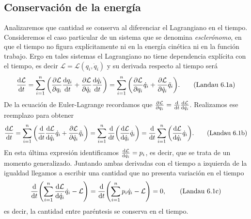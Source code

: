\documentclass[12pt, spanish, a4paper, ]{article}
\begin{document}
\subsection{Conservación de la energía}\label{conservacionEnergia} %
Analizaremos que cantidad se conserva al diferenciar el Lagrangiano en el tiempo.
Consideremos el caso particular de un sistema que se denomina \emph{esclerónomo}, en que el tiempo no figura explícitamente ni en la energía cinética ni en la función trabajo.
Ergo en tales sistemas el Lagrangiano no tiene dependencia explícita con el tiempo, es decir \(\mathcal{L}= \mathcal{L}(q_i, \dot{q}_i)\) y su derivada respecto al tiempo será
\begin{equation}\label{Landau6.1a}
	\dv{\mathcal{L}}{t}= \sum_{i=1}^n \pqty{ \pdv{\mathcal{L}}{q_i} \dv{q_i}{t}+ \pdv{\mathcal{L}}{\dot{q}_i} \dv{\dot{q}_i}{t} }
	= \sum_{i=1}^n \pqty{ \pdv{\mathcal{L}}{q_i} \dot{q}_i+ \pdv{\mathcal{L}}{\dot{q}_i} \ddot{q}_i }.
    \tag{Landau 6.1a}
\end{equation}
De la ecuación de Euler-Lagrange recordamos que \(\pdv{\mathcal{L}}{q_i}= \dv{t} \dv{\mathcal{L}}{\dot{q}_i}\).
Realizamos ese reemplazo para obtener
\begin{equation}\label{Landau6.1b}
	\dv{\mathcal{L}}{t}= \sum_{i=1}^n \pqty{ \dv{t} \dv{\mathcal{L}}{\dot{q}_i} \dot{q}_i+ \pdv{\mathcal{L}}{\dot{q}_i} \ddot{q}_i }
	= \sum_{i=1}^n \dv{t} \pqty{ \dv{\mathcal{L}}{\dot{q}_i} \dot{q}_i }
	= \dv{t} \sum_{i=1}^n \pqty{ \dv{\mathcal{L}}{\dot{q}_i} \dot{q}_i }.
	\tag{Landau 6.1b}
\end{equation}
En esta última expresión identificamos \(\dv{\mathcal{L}}{\dot{q}_i}= p_i\), es decir, que se trata de un momento generalizado.
Juntando ambas derivadas con el tiempo a izquierda de la igualdad llegamos a escribir una cantidad que no presenta variación en el tiempo
\begin{equation}\label{Landau6.1c}
	\dv{t }\pqty{ \sum_{i=1}^n \dv{\mathcal{L}}{\dot{q}_i} \dot{q}_i - \mathcal{L}}= \dv{t} \pqty{ \sum_{i=1}^n p_i \dot{q}_i - \mathcal{L}}= 0,
	\tag{Landau 6.1c}
\end{equation}
es decir, la cantidad entre paréntesis se conserva en el tiempo.
\end{document}
